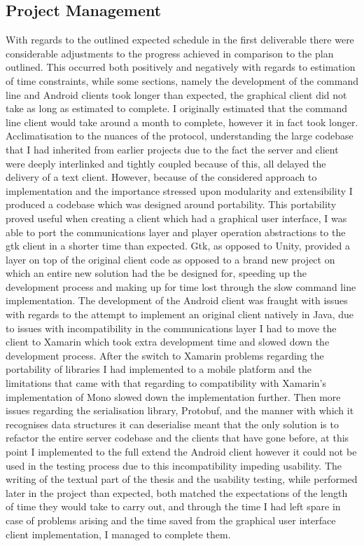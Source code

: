 \documentclass{article}
\begin{document}
\subsection{Project Management}
With regards to the outlined expected schedule in the first deliverable there were considerable adjustments to the progress achieved in comparison to the plan outlined. This occurred both positively and negatively with regards to estimation of time constraints, while some sections, namely the development of the command line and Android clients took longer than expected, the graphical client did not take as long as estimated to complete. I originally estimated that the command line client would take around a month to complete, however it in fact took longer. Acclimatisation to the nuances of the protocol, understanding the large codebase that I had inherited from earlier projects due to the fact the server and client were deeply interlinked and tightly coupled because of this, all delayed the delivery of a text client. However, because of the considered approach to implementation and the importance stressed upon modularity and extensibility I produced a codebase which was designed around portability. This portability proved useful when creating a client which had a graphical user interface, I was able to port the communications layer and player operation abstractions to the gtk client in a shorter time than expected. Gtk, as opposed to Unity, provided a layer on top of the original client code as opposed to a brand new project on which an entire new solution had the be designed for, speeding up the development process and making up for time lost through the slow command line implementation. The development of the Android client was fraught with issues with regards to the attempt to implement an original client natively in Java, due to issues with incompatibility in the communications layer I had to move the client to Xamarin which took extra development time and slowed down the development process. After the switch to Xamarin problems regarding the portability of libraries I had implemented to a mobile platform and the limitations that came with that regarding to compatibility with Xamarin’s implementation of Mono slowed down the implementation further. Then more issues regarding the serialisation library, Protobuf, and the manner with which it recognises data structures it can deserialise meant that the only solution is to refactor the entire server codebase and the clients that have gone before, at this point I implemented to the full extend the Android client however it could not be used in the testing process due to this incompatibility impeding usability. The writing of the textual part of the thesis and the usability testing, while performed later in the project than expected, both matched the expectations of the length of time they would take to carry out, and through the time I had left spare in case of problems arising and the time saved from the graphical user interface client implementation, I managed to complete them.
\end{document}
